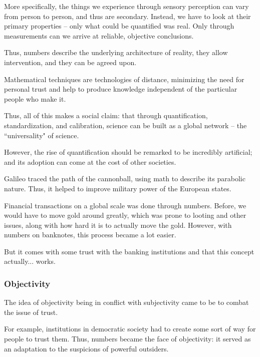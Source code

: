 \documentclass[openany]{book}
\begin{document}
More specifically, the things we experience through sensory perception can vary from person to person, and thus are secondary. Instead, we have to look at their primary properties -- only what could be quantified was real. Only through measurements can we arrive at reliable, objective conclusions.

Thus, numbers describe the underlying architecture of reality, they allow intervention, and they can be agreed upon.

Mathematical techniques are technologies of distance, minimizing the need for personal trust and help to produce knowledge independent of the particular people who make it.

Thus, all of this makes a social claim: that through quantification, standardization, and calibration, science can be built as a global network -- the ``universality" of science.

However, the rise of quantification should be remarked to be incredibly artificial; and its adoption can come at the cost of other societies.

\begin{example}
	Galileo traced the path of the cannonball, using math to describe its parabolic nature. Thus, it helped to improve military power of the European states.
\end{example}

\begin{example}
	Financial transactions on a global scale was done through numbers. Before, we would have to move gold around greatly, which was prone to looting and other issues, along with how hard it is to actually move the gold. However, with numbers on banknotes, this process became a lot easier.
	
	But it comes with some trust with the banking institutions and that this concept actually... works.
\end{example}

\subsubsection{Objectivity}
The idea of objectivity being in conflict with subjectivity came to be to combat the issue of trust.

For example, institutions in democratic society had to create some sort of way for people to trust them. Thus, numbers became the face of objectivity: it served as an adaptation to the suspicions of powerful outsiders.
\end{document}
